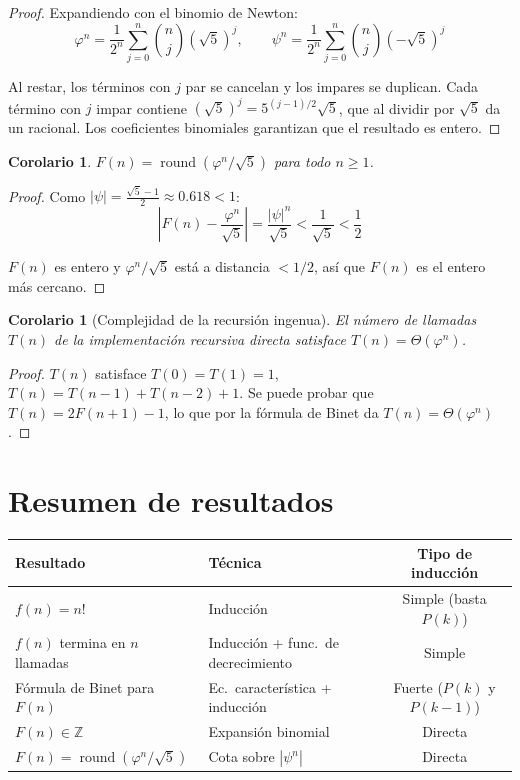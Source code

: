 \documentclass[11pt, letterpaper]{article}
\theoremstyle{definition}
\theoremstyle{plain}
\newtheorem{corollary}[theorem]{Corolario}
\theoremstyle{remark}
\begin{document}
\begin{proof}
Expandiendo con el binomio de Newton:
\[
  \varphi^n = \frac{1}{2^n}\sum_{j=0}^{n}\binom{n}{j}(\sqrt{5})^j,
  \qquad
  \psi^n = \frac{1}{2^n}\sum_{j=0}^{n}\binom{n}{j}(-\sqrt{5})^j
\]

Al restar, los términos con $j$ par se cancelan y los impares se
duplican. Cada término con $j$ impar contiene
$(\sqrt{5})^j = 5^{(j-1)/2}\sqrt{5}$, que al dividir por $\sqrt{5}$
da un racional. Los coeficientes binomiales garantizan que el
resultado es entero.
\end{proof}

\begin{corollary}\label{cor:round}
$F(n) = \operatorname{round}(\varphi^n / \sqrt{5})$ para todo $n \geq 1$.
\end{corollary}

\begin{proof}
Como $|\psi| = \frac{\sqrt{5}-1}{2} \approx 0.618 < 1$:
\[
  \left|F(n) - \frac{\varphi^n}{\sqrt{5}}\right|
  = \frac{|\psi|^n}{\sqrt{5}}
  < \frac{1}{\sqrt{5}}
  < \frac{1}{2}
\]

$F(n)$ es entero y $\varphi^n/\sqrt{5}$ está a distancia $< 1/2$,
así que $F(n)$ es el entero más cercano.
\end{proof}

\begin{corollary}[Complejidad de la recursión ingenua]\label{cor:complexity}
El número de llamadas $T(n)$ de la implementación recursiva directa
satisface $T(n) = \Theta(\varphi^n)$.
\end{corollary}

\begin{proof}
$T(n)$ satisface $T(0) = T(1) = 1$, $T(n) = T(n-1) + T(n-2) + 1$.
Se puede probar que $T(n) = 2F(n+1) - 1$, lo que por la fórmula de
Binet da $T(n) = \Theta(\varphi^n)$.
\end{proof}

\section{Resumen de resultados}

\begin{table}[h]
\centering
\begin{tabular}{llc}
\toprule
\textbf{Resultado} & \textbf{Técnica} & \textbf{Tipo de inducción} \\
\midrule
$f(n) = n!$
  & Inducción
  & Simple (basta $P(k)$) \\
$f(n)$ termina en $n$ llamadas
  & Inducción + func.\ de decrecimiento
  & Simple \\
Fórmula de Binet para $F(n)$
  & Ec.\ característica + inducción
  & Fuerte ($P(k)$ y $P(k{-}1)$) \\
$F(n) \in \mathbb{Z}$
  & Expansión binomial
  & Directa \\
$F(n) = \operatorname{round}(\varphi^n/\sqrt{5})$
  & Cota sobre $|\psi^n|$
  & Directa \\
\bottomrule
\end{tabular}
\end{table}
\end{document}

